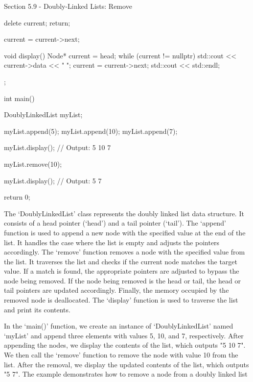 \begin{notes}{Section 5.9 - Doubly-Linked Lists: Remove}
\begin{highlight}
\begin{code}[C++]
{{{{                    delete current;
                    return;
                }
    
                current = current->next;
            }
        }
    
        void display() {
            Node* current = head;
            while (current != nullptr) {
                std::cout << current->data << " ";
                current = current->next;
            }
            std::cout << std::endl;
        }
    };
    
    int main() {
        DoublyLinkedList myList;
    
        myList.append(5);
        myList.append(10);
        myList.append(7);
    
        myList.display();  // Output: 5 10 7
    
        myList.remove(10);
    
        myList.display();  // Output: 5 7
    
        return 0;
    }        
    \end{code}
        The `DoublyLinkedList' class represents the doubly linked list data structure. It consists of a head pointer (`head') and a tail pointer (`tail'). The `append' function is used to append a new node with the specified value at the end of the list. It handles the case where the list is empty and adjusts the pointers accordingly. 
        The `remove' function removes a node with the specified value from the list. It traverses the list and checks if the current node matches the target value. If a match is found, the appropriate pointers are adjusted to bypass the node being removed. If the node being removed is the head or tail, the head or tail pointers are 
        updated accordingly. Finally, the memory occupied by the removed node is deallocated. The `display' function is used to traverse the list and print its contents.
    
        In the `main()' function, we create an instance of `DoublyLinkedList' named `myList' and append three elements with values 5, 10, and 7, respectively. After appending the nodes, we display the contents of the list, which outputs "5 10 7". We then call the `remove' function to remove the node with value 10 from the list. After 
        the removal, we display the updated contents of the list, which outputs "5 7". The example demonstrates how to remove a node from a doubly linked list
    \end{highlight}
\end{notes}

